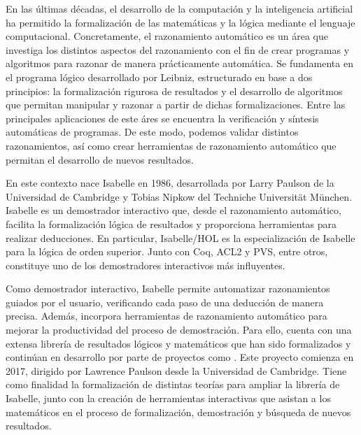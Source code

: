 \begin{isabellebody}
\begin{isamarkuptext}
	En las últimas décadas, el desarrollo de la computación y la 
  inteligencia artificial ha permitido la formalización de las 
  matemáticas y la lógica mediante el lenguaje computacional. 
  Concretamente, el razonamiento automático es un área que investiga los
  distintos aspectos del razonamiento con el fin de crear programas y
  algoritmos para razonar de manera prácticamente automática.
  Se fundamenta en el programa lógico desarrollado por Leibniz,
  estructurado en base a dos principios: la formalización rigurosa
  de resultados y el desarrollo de algoritmos que permitan manipular
  y razonar a partir de dichas formalizaciones. Entre las principales 
  aplicaciones de este áres se encuentra la verificación y síntesis 
  automáticas de programas. De este modo, podemos validar distintos 
  razonamientos, así como crear herramientas de razonamiento automático 
  que permitan el desarrollo de nuevos resultados.

  En este contexto nace Isabelle en 1986, desarrollada por Larry Paulson 
  de la Universidad de Cambridge y Tobias Nipkow del Techniche 
  Universität München. Isabelle es un demostrador interactivo que,
  desde el razonamiento automático, facilita la formalización lógica de 
  resultados y proporciona herramientas para realizar deducciones. En 
  particular, Isabelle/HOL es la especialización de Isabelle para la 
  lógica de orden superior. Junto con Coq, ACL2 y PVS, entre
  otros, constituye uno de los demostradores interactivos más 
  influyentes.

  Como demostrador interactivo, Isabelle permite automatizar 
  razonamientos guiados por el usuario, verificando cada paso de una 
  deducción de manera precisa. Además, incorpora herramientas de 
  razonamiento automático para mejorar la productividad del proceso de 
  demostración. Para ello, cuenta con una extensa librería de resultados 
  lógicos y matemáticos que han sido formalizados y continúan en 
  desarrollo por parte de proyectos como . Este proyecto 
  comienza en 2017, dirigido por Lawrence Paulson desde la Universidad 
  de Cambridge. Tiene como finalidad la formalización de distintas 
  teorías para ampliar la librería de Isabelle, junto con la creación de 
  herramientas interactivas que asistan a los matemáticos en el proceso 
  de formalización, demostración y búsqueda de nuevos resultados. 


\end{isamarkuptext}
\end{isabellebody}
